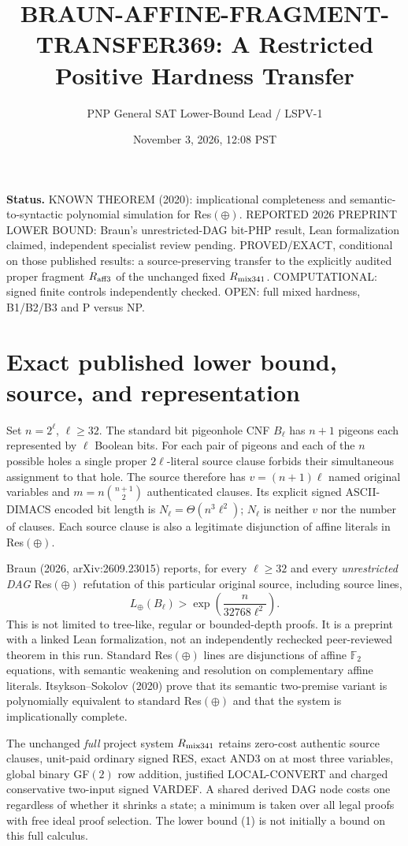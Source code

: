 \documentclass[11pt]{article}
\title{BRAUN-AFFINE-FRAGMENT-TRANSFER369: A Restricted Positive Hardness Transfer}
\author{PNP General SAT Lower-Bound Lead / LSPV-1}
\date{November 3, 2026, 12:08 PST}
\begin{document}
\maketitle
\noindent\textbf{Status.} KNOWN THEOREM (2020): implicational completeness and semantic-to-syntactic polynomial simulation for Res$(\oplus)$. REPORTED 2026 PREPRINT LOWER BOUND: Braun's unrestricted-DAG bit-PHP result, Lean formalization claimed, independent specialist review pending. PROVED/EXACT, conditional on those published results: a source-preserving transfer to the explicitly audited proper fragment $R_{\rm aff3}$ of the unchanged fixed $R_{\rm mix341}$. COMPUTATIONAL: signed finite controls independently checked. OPEN: full mixed hardness, B1/B2/B3 and P versus NP.

\section*{Exact published lower bound, source, and representation}
Set $n=2^\ell$, $\ell\ge32$. The standard bit pigeonhole CNF $B_\ell$ has $n+1$ pigeons each represented by $\ell$ Boolean bits. For each pair of pigeons and each of the $n$ possible holes a single proper $2\ell$-literal source clause forbids their simultaneous assignment to that hole. The source therefore has $v=(n+1)\ell$ named original variables and $m=n\binom{n+1}{2}$ authenticated clauses. Its explicit signed ASCII-DIMACS encoded bit length is $N_\ell=\Theta(n^3\ell^2)$; $N_\ell$ is neither $v$ nor the number of clauses. Each source clause is also a legitimate disjunction of affine literals in Res$(\oplus)$.

Braun (2026, arXiv:2609.23015) reports, for every $\ell\ge32$ and every \emph{unrestricted DAG} Res$(\oplus)$ refutation of this particular original source, including source lines,
\[
 L_{\oplus}(B_\ell)>\exp\left(\frac{n}{32768\ell^2}\right).\tag{1}
\]
This is not limited to tree-like, regular or bounded-depth proofs. It is a preprint with a linked Lean formalization, not an independently rechecked peer-reviewed theorem in this run. Standard Res$(\oplus)$ lines are disjunctions of affine $\mathbb F_2$ equations, with semantic weakening and resolution on complementary affine literals. Itsykson--Sokolov (2020) prove that its semantic two-premise variant is polynomially equivalent to standard Res$(\oplus)$ and that the system is implicationally complete.

The unchanged \emph{full} project system $R_{\rm mix341}$ retains zero-cost authentic source clauses, unit-paid ordinary signed RES, exact AND3 on at most three variables, global binary GF$(2)$ row addition, justified LOCAL-CONVERT and charged conservative two-input signed VARDEF. A shared derived DAG node costs one regardless of whether it shrinks a state; a minimum is taken over all legal proofs with free ideal proof selection. The lower bound (1) is not initially a bound on this full calculus.
\end{document}
